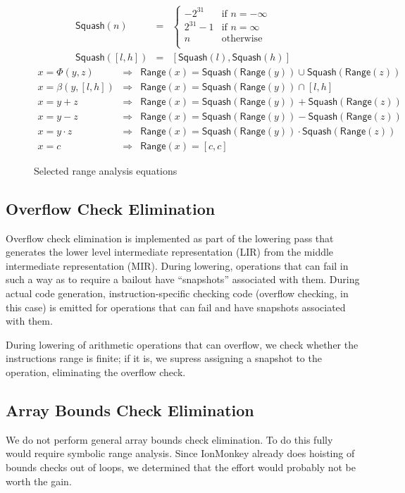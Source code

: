 \documentclass{article}
\newcommand{\Squash}{\mathsf{Squash}}
\newcommand{\Range}{\mathsf{Range}}
\let\x\cdot
\begin{document}
\begin{figure}[ht]
\begin{eqnarray*}
\Squash(n) &=& \begin{cases}
 -2^{31} &\text{if } n = -\infty \\
2^{31}-1 &\text{if } n = \infty \\
n&\text{otherwise } \\
\end{cases}\\
\Squash([l, h]) &=& [\Squash(l), \Squash(h)]
\end{eqnarray*}
%
\begin{eqnarray*}
x = \Phi(y, z) &\Rightarrow&
    \Range(x) = \Squash(\Range(y)) \cup \Squash(\Range(z)) \\
x = \beta(y, [l, h]) &\Rightarrow& \Range(x) = \Squash(\Range(y)) \cap [l, h] \\
x = y + z &\Rightarrow& \Range(x) = \Squash(\Range(y)) + \Squash(\Range(z)) \\
x = y - z &\Rightarrow& \Range(x) = \Squash(\Range(y)) - \Squash(\Range(z)) \\
x = y \x z &\Rightarrow& \Range(x) = \Squash(\Range(y)) \x \Squash(\Range(z)) \\
x = c &\Rightarrow& \Range(x) = [c, c]
\end{eqnarray*}
\caption{Selected range analysis equations}
\label{fig:range_anal}
\end{figure}

\subsection{Overflow Check Elimination}
Overflow check elimination is implemented as part of the lowering pass
that generates the lower level intermediate representation (LIR) from
the middle intermediate representation (MIR). During lowering,
operations that can fail in such a way as to require a bailout have
``snapshots'' associated with them. During actual code generation,
instruction-specific checking code (overflow checking, in this case)
is emitted for operations that can fail and have snapshots associated
with them.

During lowering of arithmetic operations that can overflow, we check
whether the instructions range is finite; if it is, we supress
assigning a snapshot to the operation, eliminating the overflow check.

\subsection{Array Bounds Check Elimination}
We do not perform general array bounds check elimination. To do this
fully would require symbolic range analysis. Since IonMonkey already
does hoisting of bounds checks out of loops, we determined that the
effort would probably not be worth the gain.
\end{document}

